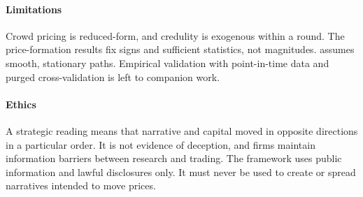 \documentclass[10pt,twocolumn,letterpaper]{article}
\theoremstyle{plain}
\theoremstyle{definition}
\theoremstyle{remark}
\begin{document}
\paragraph{Limitations} Crowd pricing is reduced-form, and credulity is exogenous within a round. The price-formation results fix signs and sufficient statistics, not magnitudes.  assumes smooth, stationary paths. Empirical validation with point-in-time data and purged cross-validation \citep{lopezdeprado2018,bailey2014dsr} is left to companion work.

\paragraph{Ethics} A strategic reading means that narrative and capital moved in opposite directions in a particular order. It is not evidence of deception, and firms maintain information barriers between research and trading. The framework uses public information and lawful disclosures only. It must never be used to create or spread narratives intended to move prices.
\end{document}
